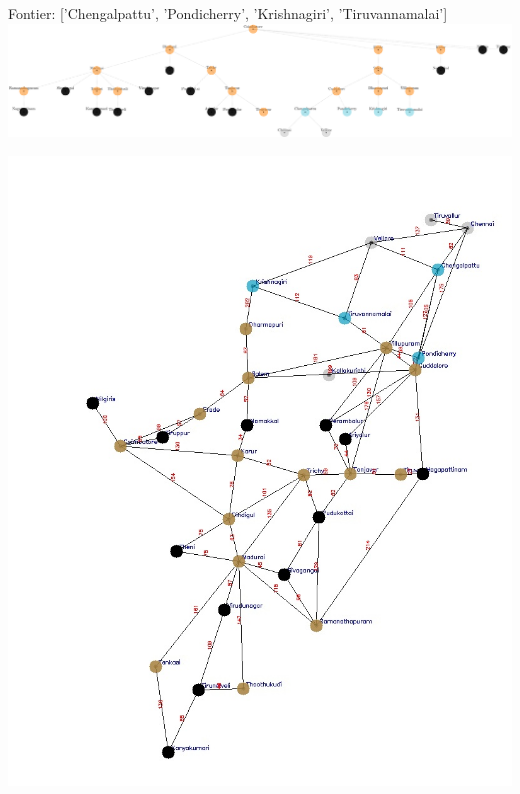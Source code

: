 \documentclass[xcolor=table]{beamer}
\begin{document}
\begin{frame}
  { \tiny Fontier: ['Chengalpattu', 'Pondicherry', 'Krishnagiri', 'Tiruvannamalai']}
  \includegraphics[width=1\textwidth]{../BFSNodes/41-1.png}
  \begin{center}
    \includegraphics[height=0.6\textheight]{../BFSoutput/tamilBFS39.jpg}
  \end{center}
\end{frame}
\end{document}
